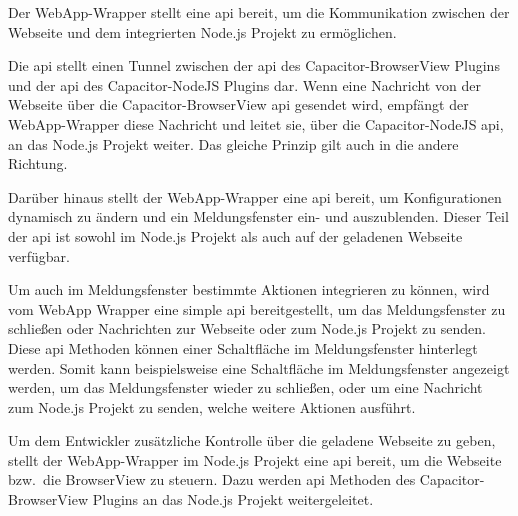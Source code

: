 Der WebApp-Wrapper stellt eine \ac{api} bereit, um die Kommunikation zwischen der Webseite und dem integrierten Node.js Projekt zu ermöglichen.

Die \ac{api} stellt einen Tunnel zwischen der \ac{api} des Capacitor-BrowserView Plugins und der \ac{api} des Capacitor-NodeJS Plugins dar.
Wenn eine Nachricht von der Webseite über die Capacitor-BrowserView \ac{api} gesendet wird, empfängt der WebApp-Wrapper diese Nachricht und leitet sie, über die Capacitor-NodeJS \ac{api}, an das Node.js Projekt weiter.
Das gleiche Prinzip gilt auch in die andere Richtung.

Darüber hinaus stellt der WebApp-Wrapper eine \ac{api} bereit, um Konfigurationen dynamisch zu ändern und ein Meldungsfenster ein- und auszublenden.
Dieser Teil der \ac{api} ist sowohl im Node.js Projekt als auch auf der geladenen Webseite verfügbar.

Um auch im Meldungsfenster bestimmte Aktionen integrieren zu können, wird vom WebApp Wrapper eine simple \ac{api} bereitgestellt, um das Meldungsfenster zu schließen oder Nachrichten zur Webseite oder zum Node.js Projekt zu senden.
Diese \ac{api} Methoden können einer Schaltfläche im Meldungsfenster hinterlegt werden.
Somit kann beispielsweise eine Schaltfläche im Meldungsfenster angezeigt werden, um das Meldungsfenster wieder zu schließen, oder um eine Nachricht zum Node.js Projekt zu senden, welche weitere Aktionen ausführt.

Um dem Entwickler zusätzliche Kontrolle über die geladene Webseite zu geben, stellt der WebApp-Wrapper im Node.js Projekt eine \ac{api} bereit, um die Webseite bzw.\ die BrowserView zu steuern.
Dazu werden \ac{api} Methoden des Capacitor-BrowserView Plugins an das Node.js Projekt weitergeleitet.
